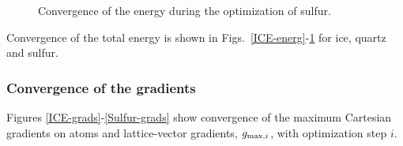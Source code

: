 \twolinestyle{\documentclass[prb,preprint]{revtex4}}
\begin{document}
{\begin{figure}[h]
\caption{Convergence of the energy during the optimization of sulfur.}
\label{Sulfur-energ}
\end{figure}
}

Convergence of the total energy is shown in 
Figs.~\ref{ICE-energ}-\ref{Sulfur-energ} for ice, quartz and sulfur.  

\subsubsection{Convergence of the gradients}

Figures \ref{ICE-grads}-\ref{Sulfur-grads} show convergence
of the maximum Cartesian gradients on atoms and lattice-vector gradients, $g_{{\rm max},i}$,
with optimization step $i$.
\end{document}
